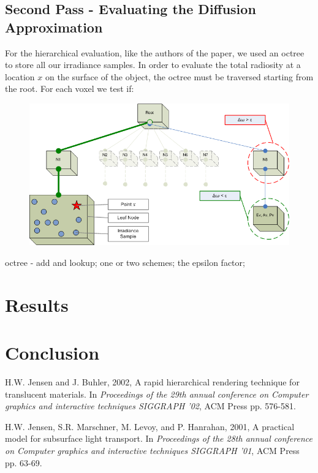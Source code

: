 \documentclass{article}
\begin{document}
\subsection{Second Pass - Evaluating the Diffusion Approximation}

For the hierarchical evaluation, like the authors of the paper, we used an octree to store all our irradiance samples. In order to evaluate the total radiosity at a location $x$ on the surface of the object, the octree must be traversed starting from the root. For each voxel we test if:


\begin{figure}[tbh]
\centering
\includegraphics[scale=0.5]{./Pictures/Octree.png}
\caption{}
\label{Hierarchical Evaluation}
\end{figure}

octree - add and lookup; one or two schemes; the epsilon factor;

\section{Results}
\section{Conclusion}

\begin{thebibliography}{99}

 H.W. Jensen and J. Buhler, 2002, A rapid hierarchical rendering technique for translucent materials. In {\it Proceedings of the 29th annual conference on Computer graphics and interactive techniques SIGGRAPH '02}, ACM Press pp. 576-581.

 H.W. Jensen, S.R. Marschner, M. Levoy, and P. Hanrahan, 2001, A practical model for subsurface light transport. In {\it Proceedings of the 28th annual conference on Computer graphics and interactive techniques SIGGRAPH '01}, ACM Press pp. 63-69.

\end{thebibliography}
\end{document}
